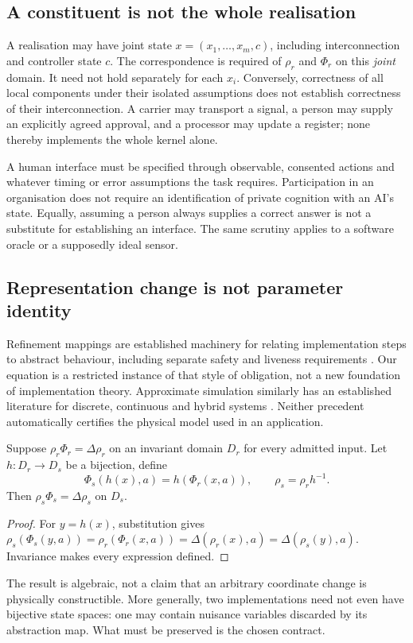 \subsection{A constituent is not the whole realisation}
A realisation may have joint state $x=(x_1,\ldots,x_m,c)$, including interconnection and controller state $c$. The correspondence is required of $\rho_r$ and $\Phi_r$ on this \emph{joint} domain. It need not hold separately for each $x_i$. Conversely, correctness of all local components under their isolated assumptions does not establish correctness of their interconnection. A carrier may transport a signal, a person may supply an explicitly agreed approval, and a processor may update a register; none thereby implements the whole kernel alone.

A human interface must be specified through observable, consented actions and whatever timing or error assumptions the task requires. Participation in an organisation does not require an identification of private cognition with an AI's state. Equally, assuming a person always supplies a correct answer is not a substitute for establishing an interface. The same scrutiny applies to a software oracle or a supposedly ideal sensor.

\subsection{Representation change is not parameter identity}\label{subsec:representationchange}
Refinement mappings are established machinery for relating implementation steps to abstract behaviour, including separate safety and liveness requirements \citep{abadi}. Our equation is a restricted instance of that style of obligation, not a new foundation of implementation theory. Approximate simulation similarly has an established literature for discrete, continuous and hybrid systems \citep{girard}. Neither precedent automatically certifies the physical model used in an application.

\begin{proposition}\label{prop:coordinates}
Suppose $\rho_r\Phi_r=\Delta\rho_r$ on an invariant domain $D_r$ for every admitted input. Let $h:D_r\to D_s$ be a bijection, define
\[
 \Phi_s(h(x),a)=h(\Phi_r(x,a)),\qquad \rho_s=\rho_r h^{-1}.
\]
Then $\rho_s\Phi_s=\Delta\rho_s$ on $D_s$.
\end{proposition}
\begin{proof}
For $y=h(x)$, substitution gives
$\rho_s(\Phi_s(y,a))=\rho_r(\Phi_r(x,a))=\Delta(\rho_r(x),a)=\Delta(\rho_s(y),a)$.
Invariance makes every expression defined.
\end{proof}
The result is algebraic, not a claim that an arbitrary coordinate change is physically constructible. More generally, two implementations need not even have bijective state spaces: one may contain nuisance variables discarded by its abstraction map. What must be preserved is the chosen contract.

